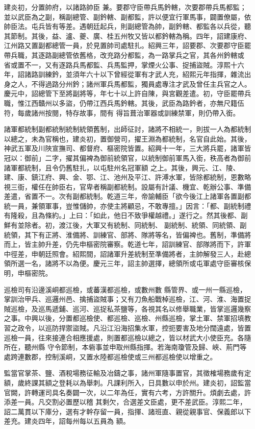 \begin{pinyinscope}
 建炎初，分置帥府，以諸路帥臣
 兼。要郡守臣帶兵馬鈐轄，次要郡帶兵馬都監；並以武臣為之副，稱副總管、副鈐轄、副都監，許以便宜行軍馬事，闢置僚屬，依帥臣法。屯兵皆有等差。遇朝廷起兵，則副總管為帥，副鈐轄、都監各以兵從，聽其節制。其後，益、瀘、夔、廣、桂五州牧又皆以都鈐轄為稱。四年，詔建康府、江州路又置副都總管一員，於見置帥司處駐扎。紹興三年，詔要郡、次要郡守臣罷帶兵職，其逐路副總管依舊格，改充路分都監，為一路掌兵之官，其各州鈐轄或
 省或置不一，又有逐路兵馬都監、兵馬監押，掌煙火公事、捉捕盜賊。淳熙十六年，詔諸路訓練鈐，並須年六十以下曾經從軍有才武人充，紹熙元年指揮，雜流出身之人，不得過路分州鈐；諸州軍兵馬都監，獨員處專注才武及曾任主兵官之人。慶元中，詔總管下至將副將等，年七十以上許自陳，與宮觀差遣。初，守臣罷帶兵職，惟江西贛州以多盜，仍帶江西兵馬鈐轄。其後，武臣為路鈐者，亦無尺籍伍符，每歲諸州按閱，特存故事，間有
 得旨葺治軍器或訓練禁軍，則仍帶入銜。



 諸軍都統制副都統制統制統領舊制，出師征討，諸將不相統一，則拔一人為都統制以總之，未為官稱也，建炎初，置御營司，擢王淵為都統制，名官自此始。其後，神武五軍及川陜宣撫司、都督府、樞密院皆置。紹興十一年，三大將兵罷，諸軍皆冠以：御前」二字，擢其偏裨為御前統領官，以統制御前軍馬入銜，秩高者為御前諸軍都統制，且令仍舊駐扎，以屯駐州名冠軍額
 之上。其後，興元、江、陵、建、康、鎮江府、興、金、鄂、江、池州及平江、許溥水軍，皆除都統制，恩數略視三衙，權任在帥臣右，官卑者稱副都統制。設屬有計議、機宜、乾辦公事、準備差遣，省置不一。次有副都統制。乾道三年，帝諭輔臣「欲今後江上諸軍各置副都統一員，兼領軍事，豈惟儲帥，亦使主將顧忌，不敢專擅。」因言：「都、副統制禮有隆殺，且為條約。」上曰：「如此，他日不致爭權越禮。」遂行之。然其後都、副鮮有並除者。初，渡江後，大軍又有統制、同統制、
 副統制、統領、同統領、副統領，其下有正將、淮備將、訓練官、部將、隊將等名，皆偏裨也。舊制，準備將而上，皆主帥升差，仍先申樞密院審察。乾道七年，詔訓練官、部隊將而下，許軍中徑差，申朝廷照會。紹熙間，詔諸軍升差統制至準備將者，主帥解發三人，赴總領所選一名，諸將不以為便。慶元三年，詔主帥選擇，總領所或屯軍處守臣審核保明，申樞密院。



 巡檢司有沿邊溪峒都巡檢，或蕃漢都巡檢，或數州數
 縣管界、或一州一縣巡檢，掌訓治甲兵、巡邏州邑、擒捕盜賊事；又有刀魚船戰棹巡檢，江、河、淮、海置捉賊巡檢，及巡馬遞鋪、巡河、巡捉私茶鹽等，各視其名以修舉職業，皆掌巡邏幾察之事。中興以後，分置都巡檢使、都巡檢、巡檢、州縣巡檢，掌土軍、禁軍招填教習之政令，以巡防捍禦盜賊。凡沿江沿海招集水軍，控扼要害及地分闊遠處，皆置巡檢一員，往來接連合相應援處，則置都巡檢以總之，皆以材武大小使臣充。各隨所在，聽州縣
 守令節制，本砦事並申取州縣指揮。若海南瓊管及歸、峽、荊門等處跨連數郡，控制溪峒，又置水陸都巡檢使或三州都巡檢使以增重之。



 監當官掌茶、鹽、酒稅場務征輸及冶鑄之事，諸州軍隨事置官，其徵榷場務歲有定額，歲終課其額之登耗以為舉刺。凡課利所入，日具數以申於州。建炎初，詔監當官闕，許轉運司具名奏闢一次，以二年為任，實有六考，方許關升。煩劇去處，許添差一員。凡交割必置歷以稽
 其剩欠，合選差文臣處，更不差武臣。淳熙二年，詔二萬貫以下庫分，選有才幹存留一員，指揮、諸班直、親從親事官、保義郎以下差充。建炎四年，詔每州每以五員為
 額。



\end{pinyinscope}
